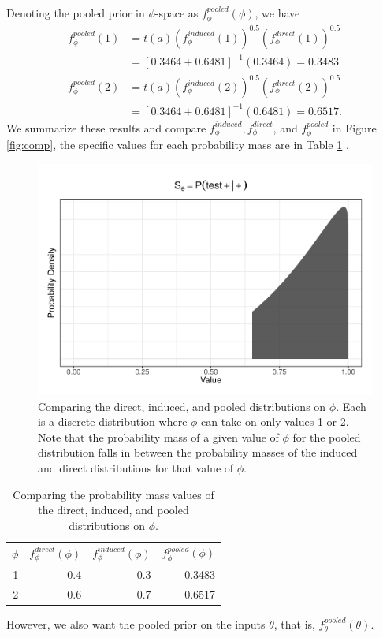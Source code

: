\documentclass[12pt,twoside]{smiththesis}
\begin{document}
\noindent Denoting the pooled prior in \(\phi\)-space as \(f_\phi^{pooled}(\phi)\), we have
\begin{align*}
f_\phi^{pooled}(1) &= t(a)(f_\phi^{induced}(1))^{0.5} (f_\phi^{direct}(1))^{0.5} \\
&= [0.3464 + 0.6481]^{-1} (0.3464)  = 0.3483\\
f_\phi^{pooled}(2)  &= t(a)(f_\phi^{induced}(2))^{0.5} (f_\phi^{direct}(2))^{0.5} \\
&= [0.3464 + 0.6481]^{-1}   (0.6481) 
=0.6517.
\end{align*}
We summarize these results and compare \(f_\phi^{induced}, f_\phi^{direct}\), and \(f_\phi^{pooled}\) in Figure \ref{fig:comp}, the specific values for each probability mass are in Table \ref{table:table-pooled} .
\begin{figure}

{\centering \includegraphics[width=1\linewidth]{thesis_files/figure-latex/unnamed-chunk-14-1} 

}

\caption{\label{fig:comp} Comparing the direct, induced, and pooled distributions on $\phi$. Each is a discrete distribution where $\phi$ can take on only values 1 or 2.  Note that the probability mass of a given value of $\phi$ for the pooled distribution falls in between the probability masses of the induced and direct distributions for that value of $\phi$.}\label{fig:unnamed-chunk-14}
\end{figure}
\begin{table}[H]

\caption{\label{tab:unnamed-chunk-15}\label{table:table-pooled} Comparing the probability mass values of the direct, induced, and pooled distributions on $\phi$.}
\centering
\begin{tabular}[t]{r|r|r|r}
\hline
$\phi$ & $f_\phi^{direct}(\phi)$ & $f_\phi^{induced}(\phi)$ & $f_\phi^{pooled}(\phi)$\\
\hline
1 & 0.4 & 0.3 & 0.3483\\
\hline
2 & 0.6 & 0.7 & 0.6517\\
\hline
\end{tabular}
\end{table}
However, we also want the pooled prior on the inputs \(\theta\), that is, \(f_\theta^{pooled}(\theta)\).
\end{document}
